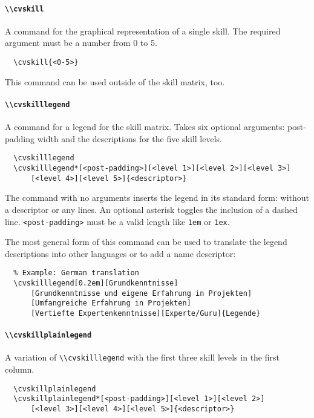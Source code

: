 \documentclass[a4paper, 11pt]{article}
\newcommand{\code}[1]{\lstinline!#1!}
\begin{document}
\paragraph{\code{\\cvskill}}
A command for the graphical representation of a single skill.
The required argument must be a number from 0 to 5.
\begin{lstlisting}
  \cvskill{<0-5>}
\end{lstlisting}
This command can be used outside of the skill matrix, too.

\paragraph{\code{\\cvskilllegend}}
A command for a legend for the skill matrix.
Takes six optional arguments: post-padding width and the descriptions for the five skill levels.
\begin{lstlisting}
  \cvskilllegend
  \cvskilllegend*[<post-padding>][<level 1>][<level 2>][<level 3>]
      [<level 4>][<level 5>]{<descriptor>}
\end{lstlisting}
The command with no arguments inserts the legend in its standard form: without a descriptor or any lines.
An optional asterisk toggles the inclusion of a dashed line.
\code{<post-padding>} must be a valid length like \code{1em} or \code{1ex}.

The most general form of this command can be used to translate the legend descriptions into other languages or to add a name descriptor:
\begin{lstlisting}
  % Example: German translation
  \cvskilllegend[0.2em][Grundkenntnisse]
      [Grundkenntnisse und eigene Erfahrung in Projekten]
      [Umfangreiche Erfahrung in Projekten]
      [Vertiefte Expertenkenntnisse][Experte/Guru]{Legende}
\end{lstlisting}

\paragraph{\code{\\cvskillplainlegend}}
A variation of \code{\\cvskilllegend} with the first three skill levels in the first column.
\begin{lstlisting}
  \cvskillplainlegend
  \cvskillplainlegend*[<post-padding>][<level 1>][<level 2>]
      [<level 3>][<level 4>][<level 5>]{<descriptor>}
\end{lstlisting}
\end{document}
